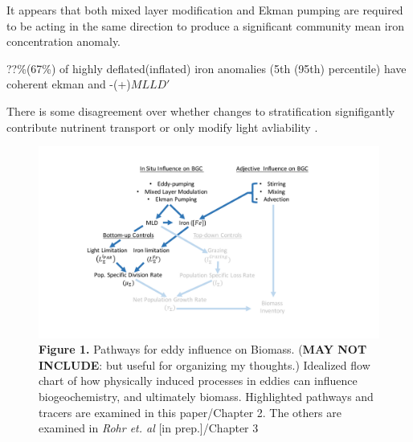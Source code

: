 It appears that both mixed layer modification and Ekman pumping are required to be acting in the same direction to produce a significant community mean iron concentration anomaly. 

??\%(67\%) of highly deflated(inflated) iron anomalies (5th (95th) percentile) have coherent ekman and  -(+)$MLLD'$ 

   
  
    There is some disagreement over whether changes to stratification signifigantly contribute nutrinent transport \parencite{SongSeasonalvariationcorrelation2018} or only modify light avliability \parencite{Levyonsetbloomdeep1998,LevyonsetSpringBloom1999}.  
    




\begin{figure}[!htbp]
\begin{adjustwidth}{-0.3in}{-.3in}
 \centering
 \includegraphics[scale=.8]{Fig1.pdf}
\end{adjustwidth}
\caption[Pathways for eddy influence on Biomass]
{\textbf{Figure 1.} Pathways for eddy influence on Biomass. (\textbf{MAY NOT INCLUDE}: but useful for organizing my thoughts.) Idealized flow chart of how physically induced processes in eddies can influence biogeochemistry, and ultimately biomass. Highlighted pathways and tracers are examined in this paper/Chapter 2. The others are examined in \textit{Rohr et. al} [in prep.]/Chapter 3 }
\label{fig:Fig1}
\end{figure}

